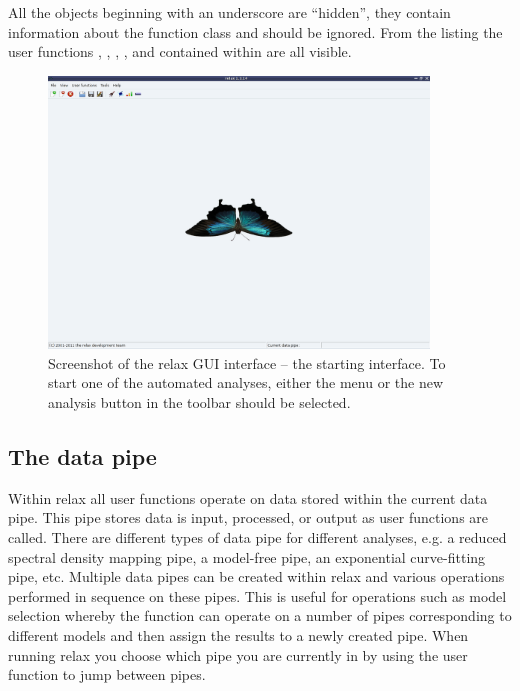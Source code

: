 All the objects beginning with an underscore are ``hidden'', they contain information about the function class and should be ignored.  From the listing the user functions , , , , and  contained within  are all visible.

\begin{figure}
\centerline{\includegraphics[width=0.9\textwidth, bb=14 14 1065 768]{graphics/screenshots/start}}
\caption[GUI screenshot]{Screenshot of the relax GUI interface -- the starting interface.  To start one of the automated analyses, either the menu  or the new analysis button in the toolbar should be selected.}\label{fig: GUI screenshot - start}
\end{figure}




\subsection{The data pipe} \label{sect: the data pipe}

Within relax all user functions operate on data stored within the current data pipe.  This pipe stores data is input, processed, or output as user functions are called.  There are different types of data pipe for different analyses, e.g. a reduced spectral density mapping pipe, a model-free pipe, an exponential curve-fitting pipe, etc.  Multiple data pipes can be created within relax and various operations performed in sequence on these pipes.  This is useful for operations such as model selection whereby the function  can operate on a number of pipes corresponding to different models and then assign the results to a newly created pipe.  When running relax you choose which pipe you are currently in by using the  user function to jump between pipes. 

